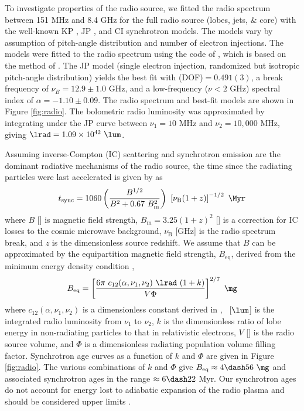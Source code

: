 \documentclass[useAMS,usenatbib]{mn2e}
\begin{document}
To investigate properties of the radio source, we fitted the radio
spectrum between 151 MHz and 8.4 GHz for the full radio source (lobes,
jets, \& core) with the well-known KP \citep{1962SvA.....6..317K,
  pach}, JP \citep{1973A&A....26..423J}, and CI
\citep{1987MNRAS.225..335H} synchrotron models. The models vary by
assumption of pitch-angle distribution and number of electron
injections. The models were fitted to the radio spectrum using the
code of \citet{2005ApJ...624..656W}, which is based on the method of
\citet{1991ApJ...383..554C}. The JP model (single electron injection,
randomized but isotropic pitch-angle distribution) yields the best fit
with \chisq(DOF)$ = 0.491(3)$, a break frequency of $\nu_B = 12.9 \pm
1.0$ GHz, and a low-frequency ($\nu < 2$ GHz) spectral index of
$\alpha = -1.10 \pm 0.09$. The radio spectrum and best-fit models are
shown in Figure \ref{fig:radio}. The bolometric radio luminosity was
approximated by integrating under the JP curve between $\nu_1 = 10$
MHz and $\nu_2 = 10,000$ MHz, giving $\lrad = 1.09\times10^{42}~\lum$.

Assuming inverse-Compton (IC) scattering and synchrotron emission are
the dominant radiative mechanisms of the radio source, the time since
the radiating particles were last accelerated is given by
\citet{2001AJ....122.1172S} as
\begin{equation}
  \tsync = 1060 \left(\frac{B^{1/2}}{B^2 + 0.67
    ~B_{\mathrm{m}}^2}\right)~ \left[\nu_{\mathrm{B}}
    (1+z)\right]^{-1/2} ~\Myr
\end{equation}
where $B$ [\mg] is magnetic field strength, $B_{\mathrm{m}} =
3.25(1+z)^2$ [\mg] is a correction for IC losses to the cosmic
microwave background, $\nu_{\mathrm{B}}$ [GHz] is the radio spectrum
break, and $z$ is the dimensionless source redshift. We assume that
$B$ can be approximated by the equipartition magnetic field strength,
$B_{\mathrm{eq}}$, derived from the minimum energy density condition
\citep{1980ARA&A..18..165M},
\begin{equation}
  B_{\mathrm{eq}} = \left[\frac{6 \pi ~c_{12}(\alpha,\nu_1, \nu_2)
      ~\lrad ~(1+k)}{V \Phi}\right]^{2/7} ~\mathrm{\mg}
\end{equation}
where $c_{12}(\alpha,\nu_1,\nu_2)$ is a dimensionless constant derived
in \citet{pach}, \lrad\ [$\lum$] is the integrated radio luminosity
from $\nu_1$ to $\nu_2$, $k$ is the dimensionless ratio of lobe energy
in non-radiating particles to that in relativistic electrons, $V$
[\cc] is the radio source volume, and $\Phi$ is a dimensionless
radiating population volume filling factor. Synchrotron age curves as
a function of $k$ and $\Phi$ are given in Figure \ref{fig:radio}. The
various combinations of $k$ and $\Phi$ give $B_{\mathrm{eq}} \approx 4
\dash 56 ~\mg$ and associated synchrotron ages in the range $\approx 6
\dash 22$ Myr. Our synchrotron ages do not account for energy lost to
adiabatic expansion of the radio plasma and should be considered upper
limits \citep{1968ARA&A...6..321S}.
\end{document}
